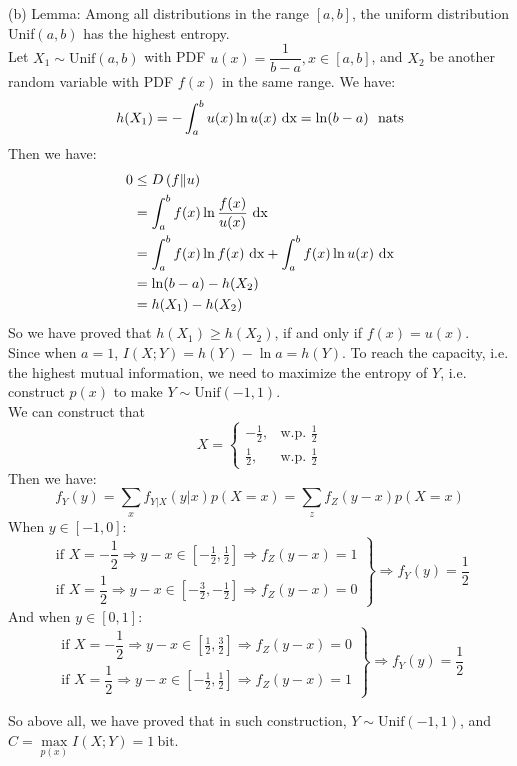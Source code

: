 (b) Lemma: Among all distributions in the range $[a,b]$, the uniform distribution Unif$(a,b)$ has the highest entropy. \\
Let $X_1\sim\text{Unif}(a,b)$ with PDF $u(x)=\dfrac{1}{b-a},x\in[a,b]$, and $X_2$ be another random variable with PDF $f(x)$ in the same range. We have:
$$h(X_1)=-\int_{a}^{b}u(x)\ln u(x) \dx = \ln(b-a) \ \ \text{nats}$$
Then we have:
\begin{align*}
0 &\leq D\left(f\|u\right) \\
&= \int_{a}^{b}f(x)\ln \dfrac{f(x)}{u(x)} {\ \text{dx}} \\
&= \int_{a}^{b}f(x)\ln f(x) {\ \text{dx}} + \int_{a}^{b}f(x)\ln u(x) {\ \text{dx}} \\
&= \ln(b-a) - h(X_2) \\
&= h(X_1) - h(X_2)
\end{align*}
So we have proved that $h(X_1)\geq h(X_2)$, if and only if $f(x)=u(x)$. \\
Since when $a=1$, $I(X;Y)=h(Y)-\ln a = h(Y)$. To reach the capacity, i.e. the highest mutual information, we need to maximize the entropy of $Y$, i.e. construct $p(x)$ to make $Y\sim \text{Unif}\left(-1,1\right)$. \\
We can construct that
$$X=\begin{cases}
-\frac{1}{2}, & \text{w.p. } \frac{1}{2} \\
\frac{1}{2}, & \text{w.p. } \frac{1}{2}
\end{cases}$$
Then we have:
$$f_Y(y)=\sum_{x}f_{Y|X}(y|x)p(X=x)=\sum_{z}f_Z(y-x)p(X=x)$$
When $y\in[-1,0]$:
$$\left.\begin{array}{l}
\text{if } X=-\dfrac{1}{2}\Rightarrow y-x\in\left[-\frac{1}{2},\frac{1}{2}\right]\Rightarrow f_Z(y-x)=1 \\
\text{if } X=\dfrac{1}{2}\Rightarrow y-x\in\left[-\frac{3}{2},-\frac{1}{2}\right]\Rightarrow f_Z(y-x)=0
\end{array}\right\} \Rightarrow f_Y(y)=\dfrac{1}{2}$$
And when $y\in[0,1]$:
$$\left.\begin{array}{l}
\text{if } X=-\dfrac{1}{2}\Rightarrow y-x\in\left[\frac{1}{2},\frac{3}{2}\right]\Rightarrow f_Z(y-x)=0 \\
\text{if } X=\dfrac{1}{2}\Rightarrow y-x\in\left[-\frac{1}{2},\frac{1}{2}\right]\Rightarrow f_Z(y-x)=1
\end{array}\right\} \Rightarrow f_Y(y)=\dfrac{1}{2}$$

So above all, we have proved that in such construction, $Y\sim\text{Unif}\left(-1,1\right)$, and $C=\max\limits_{p(x)}I(X;Y)=1 \ \text{bit}$.


